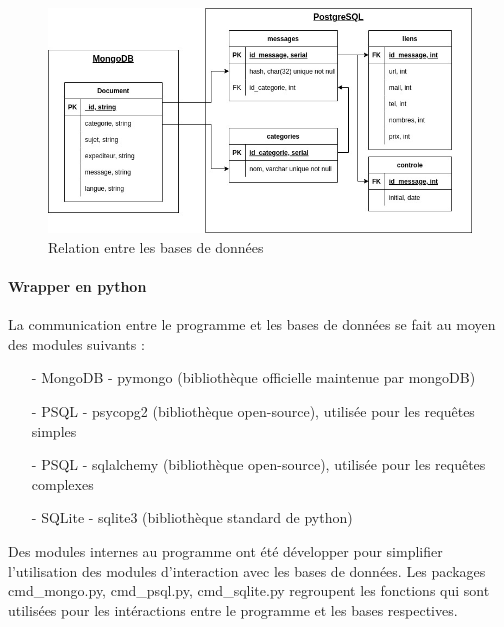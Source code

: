     \begin{figure}[H]
		\includegraphics[width=\linewidth]{img/bddFouille}
		\caption{Relation entre les bases de données}
		\label{fig:BddPhase1}
	\end{figure}

    \paragraph{Wrapper en python}
        La communication entre le programme et les bases de données se fait au moyen des modules suivants :
        \begin{itemize}
            \item[-] MongoDB - pymongo (bibliothèque officielle maintenue par mongoDB)
            \item[-] PSQL - psycopg2 (bibliothèque open-source), utilisée pour les requêtes simples
            \item[-] PSQL - sqlalchemy (bibliothèque open-source), utilisée pour les requêtes complexes
            \item[-] SQLite - sqlite3 (bibliothèque standard de python)
        \end{itemize}

        Des modules internes au programme ont été développer pour simplifier l'utilisation des modules d'interaction avec les bases de données.
        Les packages cmd\_mongo.py, cmd\_psql.py, cmd\_sqlite.py regroupent les fonctions qui sont utilisées pour les intéractions entre le programme et les bases respectives.

